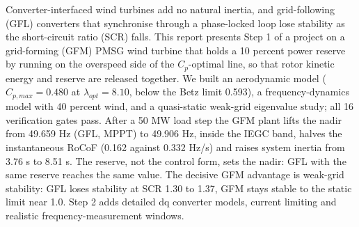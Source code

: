Converter-interfaced wind turbines add no natural inertia, and grid-following (GFL) converters that synchronise through a phase-locked loop lose stability as the short-circuit ratio (SCR) falls. This report presents Step 1 of a project on a grid-forming (GFM) PMSG wind turbine that holds a 10 percent power reserve by running on the overspeed side of the $C_p$-optimal line, so that rotor kinetic energy and reserve are released together. We built an aerodynamic model ($C_{p,max}=0.480$ at $\lambda_{opt}=8.10$, below the Betz limit 0.593), a frequency-dynamics model with 40 percent wind, and a quasi-static weak-grid eigenvalue study; all 16 verification gates pass. After a 50 MW load step the GFM plant lifts the nadir from 49.659 Hz (GFL, MPPT) to 49.906 Hz, inside the IEGC band, halves the instantaneous RoCoF (0.162 against 0.332 Hz/s) and raises system inertia from 3.76 s to 8.51 s. The reserve, not the control form, sets the nadir: GFL with the same reserve reaches the same value. The decisive GFM advantage is weak-grid stability: GFL loses stability at SCR 1.30 to 1.37, GFM stays stable to the static limit near 1.0. Step 2 adds detailed dq converter models, current limiting and realistic frequency-measurement windows.
